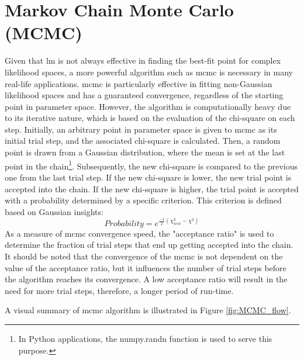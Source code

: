 \documentclass[12pt, TexShade, letterpaper]{report}
\begin{document}
\section{Markov Chain Monte Carlo (MCMC)}
Given that \gls{lm} is not always effective in finding the best-fit point for complex likelihood spaces, a more powerful algorithm such as \gls{mcmc} is necessary in many real-life applications. \gls{mcmc} is particularly effective in fitting non-Gaussian likelihood spaces and has a guaranteed convergence, regardless of the starting point in parameter space. However, the algorithm is computationally heavy due to its iterative nature, which is based on the evaluation of the chi-square on each step. Initially, an arbitrary point in parameter space is given to \gls{mcmc} as its initial trial step, and the associated chi-square is calculated. Then, a random point is drawn from a Gaussian distribution, where the mean is set at the last point in the chain\footnote{In Python applications, the numpy.randn function is used to serve this purpose.}. Subsequently, the new chi-square is compared to the previous one from the last trial step. If the new chi-square is lower, the new trial point is accepted into the chain. If the new chi-square is higher, the trial point is accepted with a probability determined by a specific criterion. This criterion is defined based on Gaussian insights:
\begin{equation}
    Probability = e^{\frac{-1}{2}\left(\chi_{new}^2 - \chi^2\right)} 
    \label{eq:mcmc_probability}
\end{equation}
As a measure of \gls{mcmc} convergence speed, the "acceptance ratio" is used to determine the fraction of trial steps that end up getting accepted into the chain. It should be noted that the convergence of the \gls{mcmc} is not dependent on the value of the acceptance ratio, but it influences the number of trial steps before the algorithm reaches its convergence. A low acceptance ratio will result in the need for more trial steps, therefore, a longer period of run-time.\par
A visual summary of \gls{mcmc} algorithm is illustrated in Figure \ref{fig:MCMC_flow}.
\end{document}
